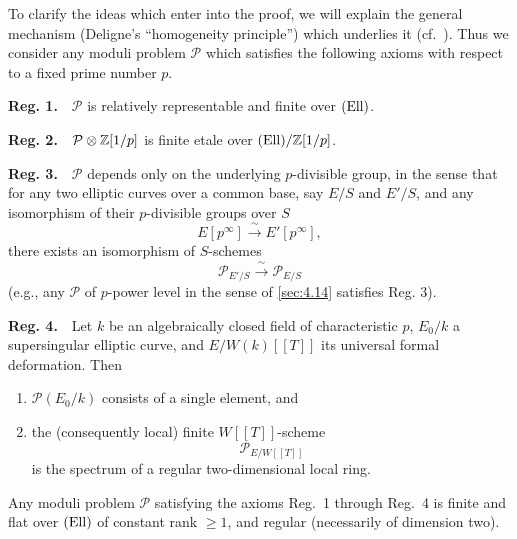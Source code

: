 To clarify the ideas which enter into the proof, we will explain the general mechanism (Deligne's ``homogeneity principle'') which underlies it (cf.\ \cite[Introduction]{DeRa}). Thus we consider any moduli problem $\mathcal{P}$ which satisfies the following axioms with respect to a fixed prime number $p$.

\smallskip
\noindent\textbf{Reg. 1.}\ \ $\mathcal{P}$ is relatively representable and finite over $(\mathrm{Ell})$.

\smallskip
\noindent\textbf{Reg. 2.}\ \ $\mathcal{P}\otimes\mathbb{Z}[1/p]$ is finite etale over $(\mathrm{Ell})/\mathbb{Z}[1/p]$.

\smallskip
\noindent\textbf{Reg. 3.}\ \ $\mathcal{P}$ depends only on the underlying $p$-divisible group, in the sense that for any two elliptic curves over a common base, say $E/S$ and $E'/S$, and any isomorphism of their $p$-divisible groups over $S$
\[
E[p^\infty] \xrightarrow{\ \sim\ } E'[p^\infty],
\]
there exists an isomorphism of $S$-schemes
\[
\mathcal{P}_{E'/S} \xrightarrow{\ \sim\ } \mathcal{P}_{E/S}
\]
(e.g., any $\mathcal{P}$ of $p$-power level in the sense of \ref{sec:4.14} satisfies Reg. 3).

\smallskip
\noindent\textbf{Reg. 4.}\ \ Let $k$ be an algebraically closed field of characteristic $p$, $E_0/k$ a supersingular elliptic curve, and $E/W(k)[[T]]$ its universal formal deformation. Then
\begin{enumerate}[label=(4\Alph*)]
\item $\mathcal{P}(E_0/k)$ consists of a single element, and
\item the (consequently local) finite $W[[T]]$-scheme
\[
\mathcal{P}_{E/W[[T]]}
\]
is the spectrum of a regular two-dimensional local ring.
\end{enumerate}

\begin{art}\label{thm:5.2.1}
Any moduli problem $\mathcal{P}$ satisfying the axioms Reg.~1 through Reg.~4 is finite and flat over $(\mathrm{Ell})$ of constant rank $\ge 1$, and regular (necessarily of dimension two).
\end{art}

